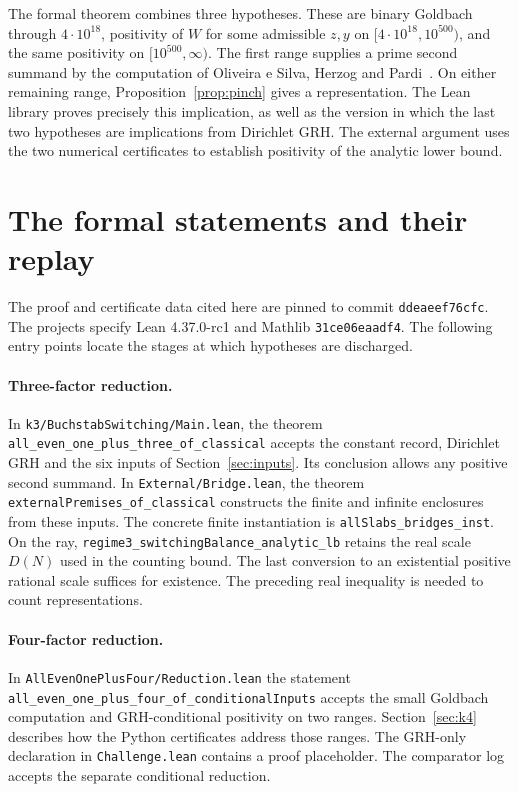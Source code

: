 \documentclass[11pt]{article}
\theoremstyle{remark}\newtheorem{remark}[theorem]{Remark}
\newcommand{\leanid}[1]{{\small\urlstyle{tt}\nolinkurl{#1}}}
\begin{document}
The formal theorem combines three hypotheses. These are binary Goldbach through
$4\cdot10^{18}$, positivity of $W$ for some admissible $z,y$ on
$[4\cdot10^{18},10^{500})$, and the same positivity on $[10^{500},\infty)$.
The first range supplies a prime second summand by the computation of Oliveira e Silva, Herzog and Pardi~\cite{OHP}. On either remaining
range, Proposition~\ref{prop:pinch} gives a representation. The Lean library
proves precisely this implication, as well as the version in which the
last two hypotheses are implications from Dirichlet GRH. The external argument uses the two numerical certificates to establish positivity of the analytic lower bound.

\section{The formal statements and their replay}\label{sec:replay}
The proof and certificate data cited here are pinned to commit
\texttt{ddeaeef76cfc}. The projects specify Lean 4.37.0-rc1 and Mathlib
\texttt{31ce06eaadf4}. The following entry points locate the stages at which hypotheses are discharged.


\paragraph{Three-factor reduction.}
In \leanid{k3/BuchstabSwitching/Main.lean}, the theorem
\leanid{all_even_one_plus_three_of_classical} accepts the constant record, Dirichlet GRH and the six inputs of Section~\ref{sec:inputs}. Its conclusion allows any positive second summand. In \leanid{External/Bridge.lean}, the theorem \leanid{externalPremises_of_classical} constructs the finite and infinite enclosures from these inputs. The concrete finite instantiation is \leanid{allSlabs_bridges_inst}. On the ray, \leanid{regime3_switchingBalance_analytic_lb} retains the real scale $D(N)$ used in the counting bound. The last conversion to an existential positive rational scale suffices for existence. The preceding real inequality is needed to count representations.
\paragraph{Four-factor reduction.}
In \leanid{AllEvenOnePlusFour/Reduction.lean} the statement
\leanid{all_even_one_plus_four_of_conditionalInputs} accepts the small Goldbach computation and GRH-conditional positivity on two ranges. Section~\ref{sec:k4} describes how the Python certificates address those ranges. The GRH-only declaration in \leanid{Challenge.lean} contains a proof placeholder. The comparator log accepts the separate conditional reduction.
\end{document}
